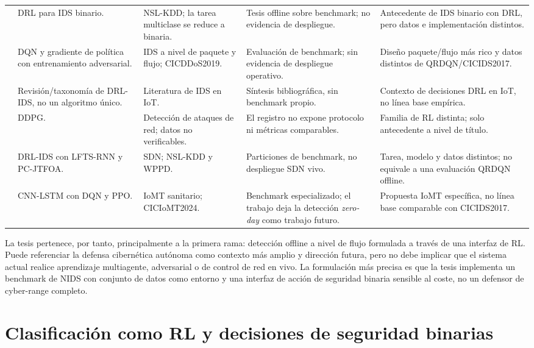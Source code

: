 \begin{longtable}{@{}p{1.75cm}p{2.05cm}p{1.95cm}p{3.55cm}p{3.00cm}@{}}
\textcite{Sanusi2023DRLIDS} & DRL para IDS binario. & NSL-KDD; la tarea multiclase se reduce a binaria. & Tesis offline sobre benchmark; no evidencia de despliegue. & Antecedente de IDS binario con DRL, pero datos e implementación distintos. \\
\textcite{Umer2022RLRLIDS} & DQN y gradiente de política con entrenamiento adversarial. & IDS a nivel de paquete y flujo; CICDDoS2019. & Evaluación de benchmark; sin evidencia de despliegue operativo. & Diseño paquete/flujo más rico y datos distintos de QRDQN/CICIDS2017. \\
\textcite{Cevallos2023DRLIDSBP} & Revisión/\allowbreak taxonomía de DRL-IDS, no un algoritmo único. & Literatura de IDS en IoT. & Síntesis bibliográfica, sin benchmark propio. & Contexto de decisiones DRL en IoT, no línea base empírica. \\
\textcite{DDPG2025AttackDetection} & DDPG. & Detección de ataques de red; datos no verificables. & El registro no expone protocolo ni métricas comparables. & Familia de RL distinta; solo antecedente a nivel de título. \\
\textcite{DRLIDSSDN2025} & DRL-IDS con LFTS-RNN y PC-JTFOA. & SDN; NSL-KDD y WPPD. & Particiones de benchmark, no despliegue SDN vivo. & Tarea, modelo y datos distintos; no equivale a una evaluación QRDQN offline. \\
\textcite{HCLRIDS2025IoMT} & CNN-LSTM con DQN y PPO. & IoMT sanitario; CICIoMT2024. & Benchmark especializado; el trabajo deja la detección \textit{zero-day} como trabajo futuro. & Propuesta IoMT específica, no línea base comparable con CICIDS2017. \\
\end{longtable}
\endgroup

La tesis pertenece, por tanto, principalmente a la primera rama: detección offline a nivel de flujo formulada a través de una interfaz de RL. Puede referenciar la defensa cibernética autónoma como contexto más amplio y dirección futura, pero no debe implicar que el sistema actual realice aprendizaje multiagente, adversarial o de control de red en vivo. La formulación más precisa es que la tesis implementa un benchmark de NIDS con conjunto de datos como entorno y una interfaz de acción de seguridad binaria sensible al coste, no un defensor de cyber-range completo.

\section{Clasificación como RL y decisiones de seguridad binarias}

